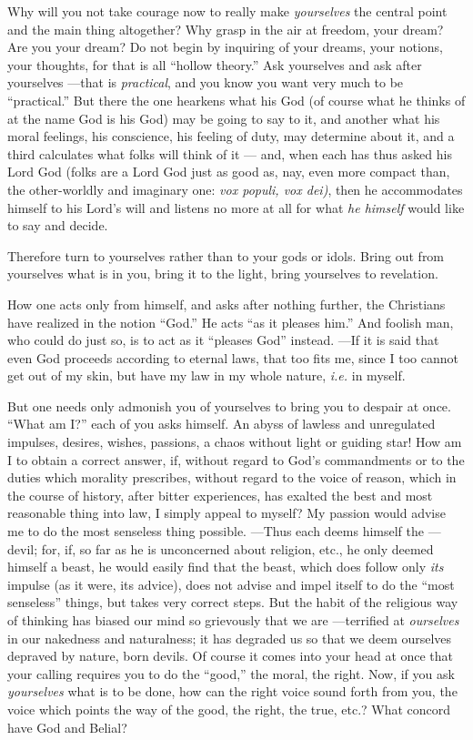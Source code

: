 Why will you not take courage now to really make \textit{yourselves} the 
central point and the main thing altogether? Why grasp in the air at freedom, 
your dream? Are you your dream? Do not begin by inquiring of your dreams, your 
notions, your thoughts, for that is all ``hollow theory.'' Ask yourselves 
and ask after yourselves ---that is \textit{practical}, and you know you want 
very much to be ``practical.'' But there the one hearkens what his God (of 
course what he thinks of at the name God is his God) may be going to say to 
it, and another what his moral feelings, his conscience, his feeling of duty, 
may determine about it, and a third calculates what folks will think of it --- 
and, when each has thus asked his Lord God (folks are a Lord God just as good 
as, nay, even more compact than, the other-worldly and imaginary one: 
\textit{vox populi, vox dei)}, then he accommodates himself to his Lord's will 
and listens no more at all for what \textit{he himself} would like to say and 
decide.

Therefore turn to yourselves rather than to your gods or idols. Bring out from 
yourselves what is in you, bring it to the light, bring yourselves to 
revelation.

How one acts only from himself, and asks after nothing further, the Christians 
have realized in the notion ``God.'' He acts ``as it pleases him.'' And 
foolish man, who could do just so, is to act as it ``pleases God'' instead. ---If it is said that even God proceeds according to eternal laws, that too 
fits me, since I too cannot get out of my skin, but have my law in my whole 
nature, \textit{i.e.} in myself.

But one needs only admonish you of yourselves to bring you to despair at once. 
``What am I?'' each of you asks himself. An abyss of lawless and unregulated 
impulses, desires, wishes, passions, a chaos without light or guiding star! 
How am I to obtain a correct answer, if, without regard to God's commandments 
or to the duties which morality prescribes, without regard to the voice of 
reason, which in the course of history, after bitter experiences, has exalted 
the best and most reasonable thing into law, I simply appeal to myself? My 
passion would advise me to do the most senseless thing possible. ---Thus each 
deems himself the ---devil; for, if, so far as he is unconcerned about 
religion, etc., he only deemed himself a beast, he would easily find that the 
beast, which does follow only \textit{its} impulse (as it were, its advice), 
does not advise and impel itself to do the ``most senseless'' things, but 
takes very correct steps. But the habit of the religious way of thinking has 
biased our mind so grievously that we are ---terrified at \textit{ourselves} 
in our nakedness and naturalness; it has degraded us so that we deem ourselves 
depraved by nature, born devils. Of course it comes into your head at once 
that your calling requires you to do the ``good,'' the moral, the right. 
Now, if you ask \textit{yourselves} what is to be done, how can the right 
voice sound forth from you, the voice which points the way of the good, the 
right, the true, etc.? What concord have God and Belial?

